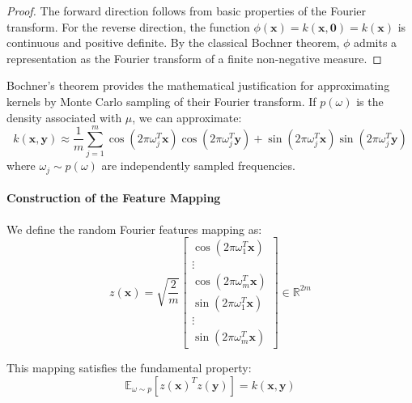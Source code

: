 \begin{proof}
The forward direction follows from basic properties of the Fourier transform. For the reverse direction, the function $\phi(\mathbf{x}) = k(\mathbf{x}, \mathbf{0}) = k(\mathbf{x})$ is continuous and positive definite. By the classical Bochner theorem, $\phi$ admits a representation as the Fourier transform of a finite non-negative measure.
\end{proof}

Bochner's theorem provides the mathematical justification for approximating kernels by Monte Carlo sampling of their Fourier transform. If $p(\omega)$ is the density associated with $\mu$, we can approximate:
\begin{equation}
k(\mathbf{x}, \mathbf{y}) \approx \frac{1}{m} \sum_{j=1}^m \cos(2\pi \omega_j^T \mathbf{x}) \cos(2\pi \omega_j^T \mathbf{y}) + \sin(2\pi \omega_j^T \mathbf{x}) \sin(2\pi \omega_j^T \mathbf{y})
\end{equation}
where $\omega_j \sim p(\omega)$ are independently sampled frequencies.

\paragraph{Construction of the Feature Mapping}

We define the random Fourier features mapping as:
\begin{equation}
z(\mathbf{x}) = \sqrt{\frac{2}{m}} \begin{bmatrix} \cos(2\pi \omega_1^T \mathbf{x}) \\ \vdots \\ \cos(2\pi \omega_m^T \mathbf{x}) \\ \sin(2\pi \omega_1^T \mathbf{x}) \\ \vdots \\ \sin(2\pi \omega_m^T \mathbf{x}) \end{bmatrix} \in \mathbb{R}^{2m}
\end{equation}

This mapping satisfies the fundamental property:
\begin{equation}
\mathbb{E}_{\omega \sim p}[z(\mathbf{x})^T z(\mathbf{y})] = k(\mathbf{x}, \mathbf{y})
\end{equation}

